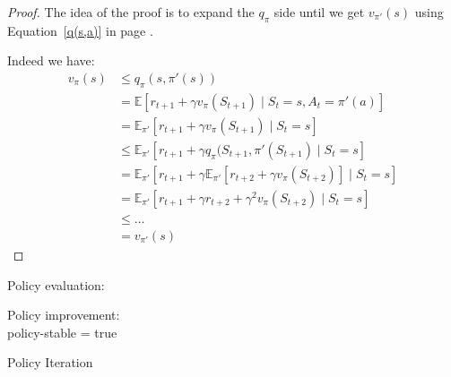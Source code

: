 \documentclass[14pt,a4paper]{article}
\theoremstyle{definition}
\begin{document}
\begin{proof}
The idea of the proof is to expand the $q_{\pi}$ side until we get $v_{\pi'}(s)$ using Equation~\ref{q(s,a)} in page \pageref{q(s,a)}.

Indeed we have: 
\begin{equation}
\begin{split}
v_{\pi}(s) &\leq q_{\pi}(s,\pi'(s))
\\&=\mathbb{E}[r_{t+1}+\gamma v_{\pi}(S_{t+1})\mid S_{t}=s, A_{t}=\pi'(a)]
\\&=\mathbb{E}_{\pi'}[r_{t+1}+\gamma v_{\pi}(S_{t+1})\mid S_{t}=s]
\\& \leq \mathbb{E}_{\pi'}[r_{t+1}+\gamma q_{\pi}(S_{t+1},\pi'(S_{t+1}) \mid S_{t}=s]
\\& = \mathbb{E}_{\pi'}[r_{t+1}+\gamma \mathbb{E}_{\pi'}[r_{t+2}+\gamma v_{\pi}(S_{t+2})]\mid S_{t}=s]
\\& = \mathbb{E}_{\pi'}[r_{t+1}+\gamma r_{t+2}+\gamma^2 v_{\pi}(S_{t+2})\mid S_{t}=s]
\\& \leq \ldots
\\&= v_{\pi'}(s)
\end{split}
\end{equation}
\end{proof}


\begin{algorithm}
    
	
	Policy evaluation:\\
     
     Policy improvement: \\
     policy-stable = true \\
     
	\caption{Policy Iteration}
	\label{algo3}
\end{algorithm}
\end{document}
